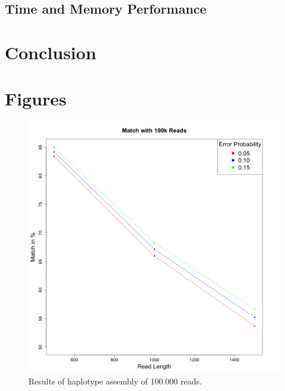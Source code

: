\documentclass[10pt,a4paper]{article}
\begin{document}
\subsection{Time and Memory Performance}


\section{Conclusion}


{}

\newpage
\appendix
\section{Figures}
\begin{figure}[!ht]
\centering
\label{fig:100k}
\includegraphics[height=0.43\textheight]{../output/plots/plot100k}
\caption{\footnotesize Results of haplotype assembly of 100.000 reads.}
\label{fig:500k}

\end{figure}
\end{document}
